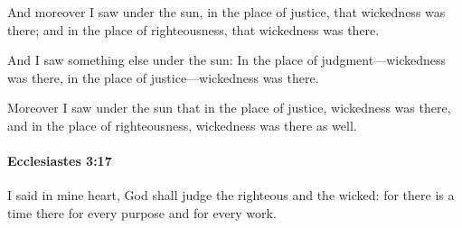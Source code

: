 			\begin{versebox}
					\item[BHS] 
					\item[LXX] 
					\item[ASV] And moreover I saw under the sun, in the place of justice, that wickedness was there; and in the place of righteousness, that wickedness was there.
					\item[NIV] And I saw something else under the sun: In the place of judgment—wickedness was there, in the place of justice—wickedness was there.
					\item[NRSV] Moreover I saw under the sun that in the place of justice, wickedness was there, and in the place of righteousness, wickedness was there as well.
			\end{versebox}

		\paragraph{Ecclesiastes 3:17} %
			\label{ECCLESIASTES-3-17}

			I said in mine heart, God shall judge the righteous and the wicked: for there is a time there for every purpose and for every work.


